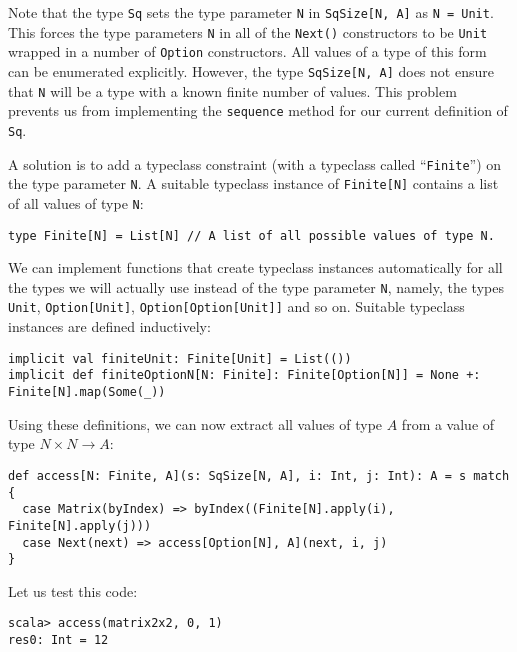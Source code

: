 Note that the type \lstinline!Sq! sets the type parameter \lstinline!N!
in \lstinline!SqSize[N, A]! as \lstinline!N = Unit!. This forces
the type parameters \lstinline!N! in all of the \lstinline!Next()!
constructors to be \lstinline!Unit! wrapped in a number of \lstinline!Option!
constructors. All values of a type of this form can be enumerated
explicitly. However, the type \lstinline!SqSize[N, A]! does not ensure
that \lstinline!N! will be a type with a known finite number of values.
This problem prevents us from implementing the \lstinline!sequence!
method for our current definition of \lstinline!Sq!.

A solution is to add a typeclass constraint (with a typeclass called
\textsf{``}\lstinline!Finite!\textsf{''}) on the type parameter \lstinline!N!. A
suitable typeclass instance of \lstinline!Finite[N]! contains a list
of all values of type \lstinline!N!:
\begin{lstlisting}
type Finite[N] = List[N] // A list of all possible values of type N.
\end{lstlisting}
We can implement functions that create typeclass instances automatically
for all the types we will actually use instead of the type parameter
\lstinline!N!, namely, the types \lstinline!Unit!, \lstinline!Option[Unit]!,
\lstinline!Option[Option[Unit]]! and so on. Suitable typeclass instances
are defined inductively:
\begin{lstlisting}
implicit val finiteUnit: Finite[Unit] = List(())
implicit def finiteOptionN[N: Finite]: Finite[Option[N]] = None +: Finite[N].map(Some(_))
\end{lstlisting}

Using these definitions, we can now extract all values of type $A$
from a value of type $N\times N\rightarrow A$:
\begin{lstlisting}
def access[N: Finite, A](s: SqSize[N, A], i: Int, j: Int): A = s match {
  case Matrix(byIndex) => byIndex((Finite[N].apply(i), Finite[N].apply(j)))
  case Next(next) => access[Option[N], A](next, i, j)
}
\end{lstlisting}
Let us test this code:
\begin{lstlisting}
scala> access(matrix2x2, 0, 1)
res0: Int = 12
\end{lstlisting}

